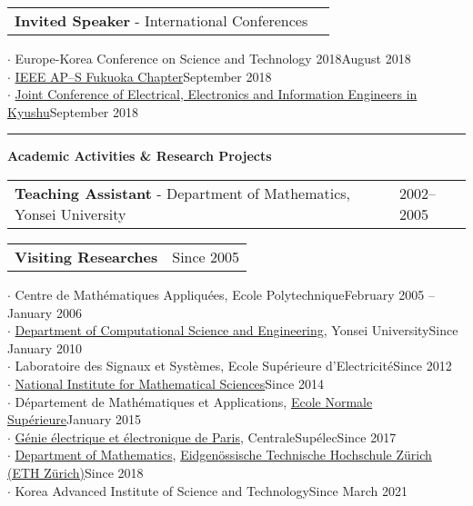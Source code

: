 \documentclass[10pt,A4]{article}
\newcommand{\cvsection}[1]
{
	\begin{center}
		\large\textcolor{sectcol}{\textbf{#1}}
	\end{center}
}
\newcommand{\cveventthree}[3]
{

\begin{tabular*}{1\textwidth}{p{13.6cm}  x{3.9cm}}
	\textbf{#2} - \textcolor{bgcol}{#3} &   \vspace{2.5pt}\textcolor{sectcol}{#1}
\end{tabular*}

}
\newcommand{\cveventsix}[6]
{

\begin{tabular*}{1\textwidth}{p{13.6cm}  x{3.9cm}}
	\textbf{#2} - \textcolor{bgcol}{#3} &   \vspace{2.5pt}\textcolor{sectcol}{#1}
\end{tabular*}


  $\cdot$ #4\\[3pt]
  $\cdot$ #5\\[3pt]
  $\cdot$ #6\\[6pt]

}
\begin{document}
\cveventsix{}{Invited Speaker}{International Conferences}
{Europe-Korea Conference on Science and Technology 2018\hfill August 2018}{\href{http://ewh.ieee.org/r10/fukuoka/aps/index.html}{IEEE AP--S Fukuoka Chapter}\hfill September 2018}{\href{http://www.jceee-kyushu.jp/asia_session}{\nth{71} Joint Conference of Electrical, Electronics and Information Engineers in Kyushu}\hfill September 2018}\vspace{-6pt}
\textcolor{softcol}{\hrule}

\cvsection{Academic Activities \& Research Projects}
\cveventthree{2002--2005}{Teaching Assistant}{Department of Mathematics, Yonsei University}
\vspace{6pt}
\begin{tabular*}{1\textwidth}{p{13.6cm}  x{3.9cm}}
	\textbf{Visiting Researches} &   \vspace{2.5pt}\textcolor{sectcol}{Since 2005}
\end{tabular*}


  $\cdot$ Centre de Math\'ematiques Appliqu\'ees, Ecole Polytechnique\hfill February 2005 -- January 2006\\[3pt]
  $\cdot$ \href{http://http://web.yonsei.ac.kr/CSEgrad/}{Department of Computational Science and Engineering}, Yonsei University\hfill Since January 2010\\[3pt]
  $\cdot$ Laboratoire des Signaux et Syst\`emes, Ecole Sup\'erieure d'Electricit\'e\hfill Since 2012\\[3pt]
  $\cdot$ \href{http://nims.re.kr/}{National Institute for Mathematical Sciences}\hfill Since 2014\\[3pt]
  $\cdot$ D\'epartement de Math\'ematiques et Applications, \href{http://www.ens.fr/}{Ecole Normale Sup\'erieure}\hfill January 2015\\[3pt]
  $\cdot$ \href{http//geeps.CentraleSup{\'e}lec.fr}{G\'enie \'electrique et \'electronique de Paris}, CentraleSup{\'e}lec\hfill Since 2017\\[3pt]
  $\cdot$ \href{http://www.math.ethz.ch/}{Department of Mathematics}, \href{http://www.ethz.ch/}{Eidgen{\"o}ssische Technische Hochschule Z{\"u}rich (ETH Z{\"u}rich)}\hfill Since 2018\\[3pt]
  $\cdot$ Korea Advanced Institute of Science and Technology\hfill Since March 2021\\[6pt]
  
\end{document}
